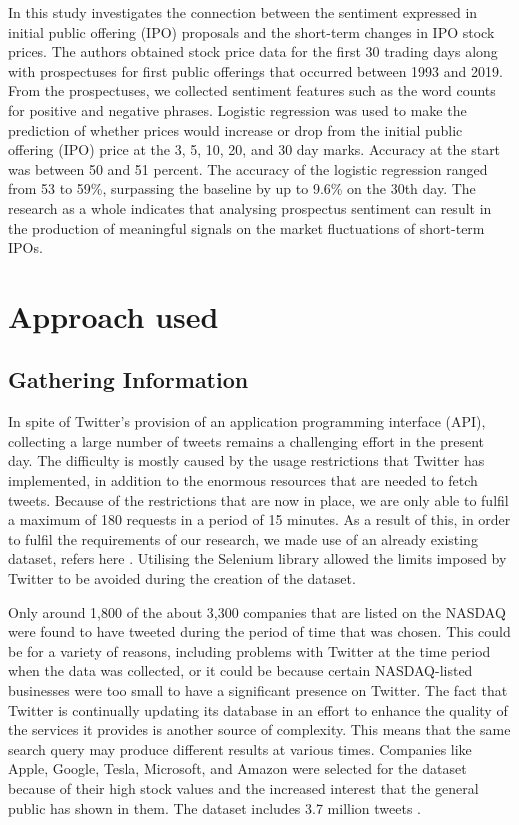 \documentclass[12pt, a4paper,twoside]{report}
\theoremstyle{plain} %
\theoremstyle{definition} %
\theoremstyle{remark} %
\numberwithin{equation}{chapter}
\begin{document}
In this study investigates the connection between the sentiment expressed in initial public offering (IPO) proposals and the short-term changes in IPO stock prices. The authors obtained stock price data for the first 30 trading days along with prospectuses for first public offerings that occurred between 1993 and 2019. From the prospectuses, we collected sentiment features such as the word counts for positive and negative phrases. Logistic regression was used to make the prediction of whether prices would increase or drop from the initial public offering (IPO) price at the 3, 5, 10, 20, and 30 day marks. Accuracy at the start was between 50 and 51 percent. The accuracy of the logistic regression ranged from 53 to 59\%, surpassing the baseline by up to 9.6\% on the 30th day. The research as a whole indicates that analysing prospectus sentiment can result in the production of meaningful signals on the market fluctuations of short-term IPOs\cite{Ferris2013}.

\chapter{Approach used }\label{ch:3}
    \section{Gathering Information}
In spite of Twitter's provision of an application programming interface (API), collecting a large number of tweets remains a challenging effort in the present day. The difficulty is mostly caused by the usage restrictions that Twitter has implemented, in addition to the enormous resources that are needed to fetch tweets. Because of the restrictions that are now in place, we are only able to fulfil a maximum of 180 requests in a period of 15 minutes. As a result of this, in order to fulfil the requirements of our research, we made use of an already existing dataset, refers here \cite{Tweets} \cite{Values}. Utilising the Selenium library allowed the limits imposed by Twitter to be avoided during the creation of the dataset.

Only around 1,800 of the about 3,300 companies that are listed on the NASDAQ were found to have tweeted during the period of time that was chosen. This could be for a variety of reasons, including problems with Twitter at the time period when the data was collected, or it could be because certain NASDAQ-listed businesses were too small to have a significant presence on Twitter. The fact that Twitter is continually updating its database in an effort to enhance the quality of the services it provides is another source of complexity. This means that the same search query may produce different results at various times. Companies like Apple, Google, Tesla, Microsoft, and Amazon were selected for the dataset because of their high stock values and the increased interest that the general public has shown in them. The dataset includes 3.7 million tweets \cite{li2014news}.
\end{document}
